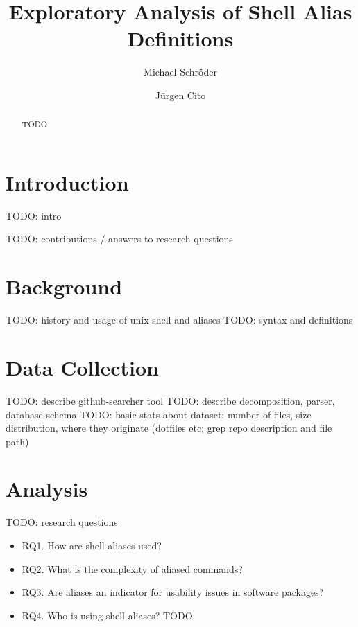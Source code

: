 \documentclass[sigconf,review]{acmart}
\begin{document}
\title{Exploratory Analysis of Shell Alias Definitions}

\author{Michael Schröder}

\author{Jürgen Cito}

\begin{abstract}
	TODO
\end{abstract}

\maketitle

\section{Introduction}

TODO: intro

TODO: contributions / answers to research questions

\section{Background}

TODO: history and usage of unix shell and aliases
TODO: syntax and definitions

\section{Data Collection}

TODO: describe github-searcher tool
TODO: describe decomposition, parser, database schema
TODO: basic stats about dataset: number of files, size distribution, where they originate (dotfiles etc; grep repo description and file path)

\section{Analysis}

TODO: research questions

\begin{itemize}
	\item RQ1. How are shell aliases used?
	\item RQ2. What is the complexity of aliased commands? %
	\item RQ3. Are aliases an indicator for usability issues in software packages? %
	\item RQ4. Who is using shell aliases? TODO
\end{itemize}
\end{document}
